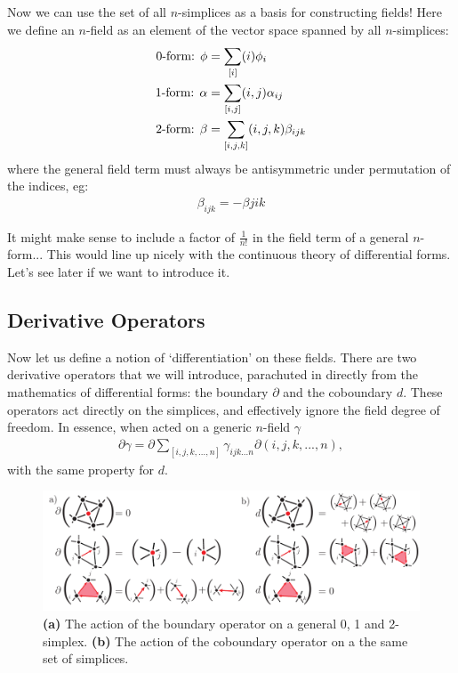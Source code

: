 \documentclass[11pt, oneside]{article} %
\numberwithin{equation}{section}
\begin{document}
Now we can use the set of all $n$-simplices as a basis for constructing fields! Here we define an $n$-field as an element of the vector space spanned by all $n$-simplices:
\begin{align}
    \textup{0-form: } \phi &= \sum_{[i]} (i) \phi_{i}  \\ 
    \textup{1-form: } \alpha &= \sum_{[i,j]} (i,j) \alpha_{ij} \\ 
    \textup{2-form: } \beta &= \sum_{[i,j,k]}(i,j,k) \beta_{ijk} 
\end{align}
where the general field term must always be antisymmetric under permutation of the indices, eg:
\begin{align}
    \beta_{ijk} = - \beta{jik}
\end{align}

\begin{shaded}
    It might make sense to include a factor of $\frac 1{n!}$ in the field term of a general $n$-form... This would line up nicely with the continuous theory of differential forms. Let's see later if we want to introduce it.
\end{shaded}

\subsection{Derivative Operators}

Now let us define a notion of `differentiation' on these fields. There are two derivative operators that we will introduce, parachuted in directly from the mathematics of differential forms: the boundary $\partial$ and the coboundary $d$. These operators act directly on the simplices, and effectively ignore the field degree of freedom. In essence, when acted on a generic $n$-field $\gamma$
\begin{align}
    \partial \gamma = \partial \sum_{[i,j,k,...,n]} \gamma_{ijk...n} \partial (i,j,k,...,n),
\end{align}
with the same property for $d$.

\begin{figure}
    \centering
    \includegraphics[width=\linewidth]{figs/boundaries.pdf}
    \caption{
    \textbf{(a)} The action of the boundary operator on a general 0, 1 and 2-simplex.
    \textbf{(b)} The action of the coboundary operator on a the same set of simplices.
    }
    \label{fig:boundaries}
\end{figure}
\end{document}
